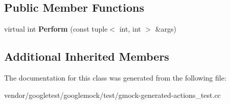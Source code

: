 \subsection*{Public Member Functions}
\begin{DoxyCompactItemize}
\item 
\mbox{\label{classtesting_1_1gmock__generated__actions__test_1_1_substract_action_ac049ec6196668e17ef7384e08914f2c3}} 
virtual int {\bfseries Perform} (const tuple$<$ int, int $>$ \&args)
\end{DoxyCompactItemize}
\subsection*{Additional Inherited Members}


The documentation for this class was generated from the following file\+:\begin{DoxyCompactItemize}
\item 
vendor/googletest/googlemock/test/gmock-\/generated-\/actions\+\_\+test.\+cc\end{DoxyCompactItemize}
